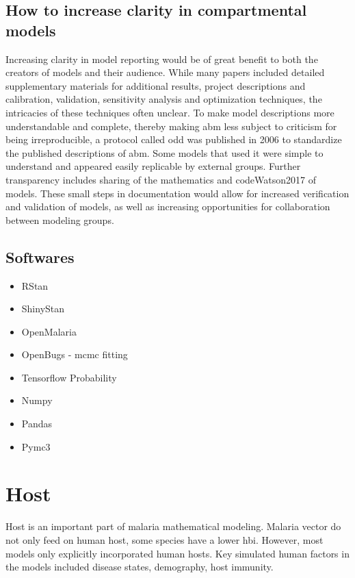 \documentclass[a4paper, 12pt, twoside]{article}
\begin{document}
\subsection{How to increase clarity in compartmental models}%
\label{sub:incresing_clarity}
Increasing clarity in model reporting would be of great benefit to both the creators of models and their audience.
While many papers included detailed supplementary materials for additional results, project descriptions and calibration, validation, sensitivity analysis and optimization techniques, the intricacies of these techniques often unclear.
To make model descriptions more understandable and complete, thereby making \gls{abm} less subject to criticism for being irreproducible, a protocol called \gls{odd} \cite{Grimm2010} was published in 2006 to standardize the published descriptions of \gls{abm}.
Some models that used it \cite{Zhu2015, Zhu2015a, Watson2017} were simple to understand and appeared easily replicable by external groups.
Further transparency includes sharing of the mathematics and code{Watson2017} of models.
These small steps in documentation would allow for increased verification and validation of models, as well as increasing opportunities for collaboration between modeling groups.

\subsection{Softwares}

\begin{itemize}
  \item RStan
	\item ShinyStan
	\item OpenMalaria
	\item OpenBugs - \gls{mcmc} fitting \cite{Lunn2009}
	\item Tensorflow Probability
	\item Numpy
	\item Pandas
	\item Pymc3
\end{itemize}

\section{Host}%
\label{sec:Host}
Host is an important part of malaria mathematical modeling.
Malaria vector do not only feed on human host, some species have a lower \gls{hbi}.
However, most models only explicitly incorporated human hosts.
Key simulated human factors in the models included disease states, demography, host immunity.
\end{document}
